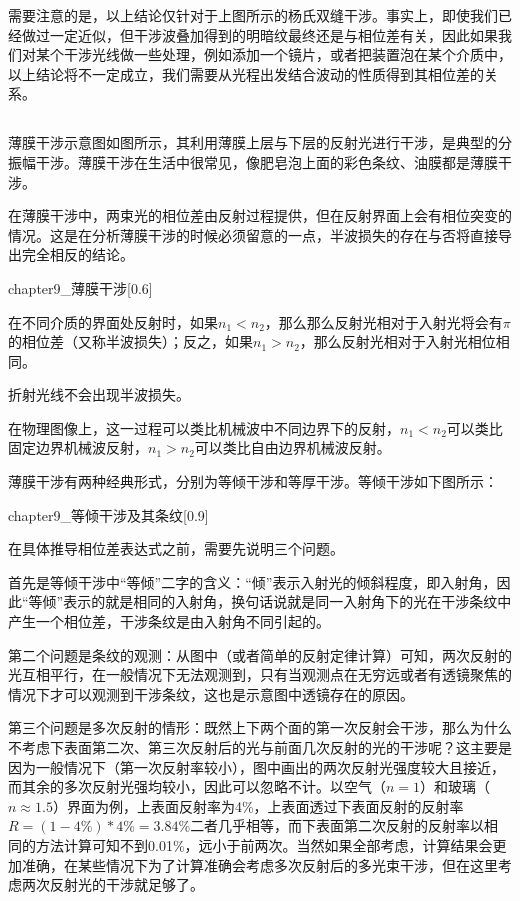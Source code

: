 需要注意的是，以上结论仅针对于上图所示的杨氏双缝干涉。事实上，即使我们已经做过一定近似，但干涉波叠加得到的明暗纹最终还是与相位差有关，因此如果我们对某个干涉光线做一些处理，例如添加一个镜片，或者把装置泡在某个介质中，以上结论将不一定成立，我们需要从光程出发结合波动的性质得到其相位差的关系。

\subsection[薄膜干涉]{}
薄膜干涉示意图如图所示，其利用薄膜上层与下层的反射光进行干涉，是典型的分振幅干涉。薄膜干涉在生活中很常见，像肥皂泡上面的彩色条纹、油膜都是薄膜干涉。

在薄膜干涉中，两束光的相位差由反射过程提供，但在反射界面上会有相位突变的情况。这是在分析薄膜干涉的时候必须留意的一点，半波损失的存在与否将直接导出完全相反的结论。
\begin{singlefigure}[薄膜干涉]{chapter9_薄膜干涉}[0.6]
\end{singlefigure}

\begin{law}
    在不同介质的界面处反射时，如果$n_1 < n_2$，那么那么反射光相对于入射光将会有$\pi$的相位差（又称半波损失）；反之，如果$n_1 > n_2$，那么反射光相对于入射光相位相同。

    折射光线不会出现半波损失。
\end{law}

在物理图像上，这一过程可以类比机械波中不同边界下的反射，$n_1<n_2$可以类比固定边界机械波反射，$n_1>n_2$可以类比自由边界机械波反射。

薄膜干涉有两种经典形式，分别为等倾干涉和等厚干涉。等倾干涉如下图所示：
\begin{singlefigure}[等倾干涉及其条纹]{chapter9_等倾干涉及其条纹}[0.9]
\end{singlefigure}

在具体推导相位差表达式之前，需要先说明三个问题。

首先是等倾干涉中“等倾”二字的含义：“倾”表示入射光的倾斜程度，即入射角，因此“等倾”表示的就是相同的入射角，换句话说就是同一入射角下的光在干涉条纹中产生一个相位差，干涉条纹是由入射角不同引起的。

第二个问题是条纹的观测：从图中（或者简单的反射定律计算）可知，两次反射的光互相平行，在一般情况下无法观测到，只有当观测点在无穷远或者有透镜聚焦的情况下才可以观测到干涉条纹，这也是示意图中透镜存在的原因。

第三个问题是多次反射的情形：既然上下两个面的第一次反射会干涉，那么为什么不考虑下表面第二次、第三次反射后的光与前面几次反射的光的干涉呢？这主要是因为一般情况下（第一次反射率较小），图中画出的两次反射光强度较大且接近，而其余的多次反射光强均较小，因此可以忽略不计。以空气（$n=1$）和玻璃（$n\approx1.5$）界面为例，上表面反射率为4\%，上表面透过下表面反射的反射率$R=(1-4\%)*4\%=3.84\%$二者几乎相等，而下表面第二次反射的反射率以相同的方法计算可知不到0.01\%，远小于前两次。当然如果全部考虑，计算结果会更加准确，在某些情况下为了计算准确会考虑多次反射后的多光束干涉，但在这里考虑两次反射光的干涉就足够了。

